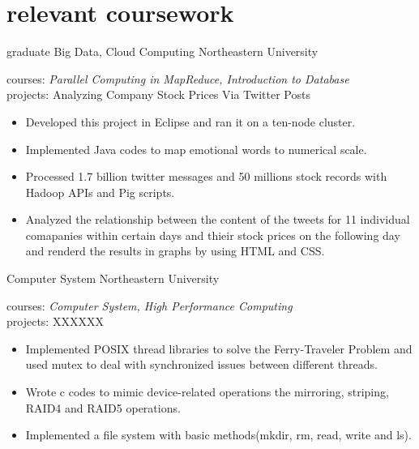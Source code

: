 \documentclass[]{ly-cv} %
\begin{document}

\section{relevant coursework}

\begin{entrylist}
\entry
{graduate}
{Big Data, Cloud Computing}
{Northeastern University}
{courses: \emph{Parallel Computing in MapReduce, Introduction to Database}\vspace*{4pt}\\
projects: Analyzing Company Stock Prices Via Twitter Posts
\begin{itemize}
      \item Developed this project in Eclipse and ran it on a ten-node cluster.
      \item Implemented Java codes to map emotional words to numerical scale.
      \item Processed 1.7 billion twitter messages and 50 millions stock records with Hadoop APIs and Pig scripts.
      \item Analyzed the relationship between the content of the tweets for 11 individual comapanies within certain days and thieir stock prices on the following day and renderd the results in graphs by using HTML and CSS.
\end{itemize}}
\end{entrylist}
\begin{entrylist}
\entry
{}
{Computer System}
{Northeastern University}
{courses: \emph{Computer System, High Performance Computing}\vspace*{4pt}\\
projects: XXXXXX
\begin{itemize}
       \item Implemented POSIX thread libraries to solve the Ferry-Traveler Problem and used mutex to deal with synchronized issues between different threads.
       \item Wrote c codes to mimic device-related operations the mirroring, striping, RAID4 and RAID5 operations.
       \item Implemented a file system with basic methods(mkdir, rm, read, write and ls).
\end{itemize}}
\end{entrylist}
\end{document}

